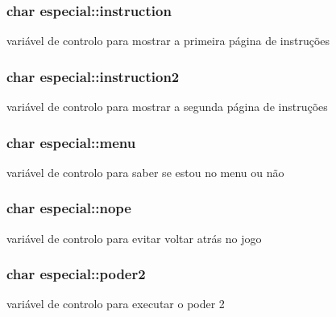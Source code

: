\subsubsection[{\texorpdfstring{instruction}{instruction}}]{\setlength{\rightskip}{0pt plus 5cm}char especial\+::instruction}\hypertarget{structespecial_a66223c39cedcea3a1185b0fc313880cf}{}\label{structespecial_a66223c39cedcea3a1185b0fc313880cf}
variável de controlo para mostrar a primeira página de instruções 
\subsubsection[{\texorpdfstring{instruction2}{instruction2}}]{\setlength{\rightskip}{0pt plus 5cm}char especial\+::instruction2}\hypertarget{structespecial_af4794f16d295ffd4ecb261aa7e2027c6}{}\label{structespecial_af4794f16d295ffd4ecb261aa7e2027c6}
variável de controlo para mostrar a segunda página de instruções 
\subsubsection[{\texorpdfstring{menu}{menu}}]{\setlength{\rightskip}{0pt plus 5cm}char especial\+::menu}\hypertarget{structespecial_aadc0f3728cac058700a8b2aa144b7720}{}\label{structespecial_aadc0f3728cac058700a8b2aa144b7720}
variável de controlo para saber se estou no menu ou não 
\subsubsection[{\texorpdfstring{nope}{nope}}]{\setlength{\rightskip}{0pt plus 5cm}char especial\+::nope}\hypertarget{structespecial_aeed061e97d44e7788b2c07a44f3ce3b3}{}\label{structespecial_aeed061e97d44e7788b2c07a44f3ce3b3}
variável de controlo para evitar voltar atrás no jogo 
\subsubsection[{\texorpdfstring{poder2}{poder2}}]{\setlength{\rightskip}{0pt plus 5cm}char especial\+::poder2}\hypertarget{structespecial_a9c1028cbef94087ff7bbffe460260528}{}\label{structespecial_a9c1028cbef94087ff7bbffe460260528}
variável de controlo para executar o poder 2 
